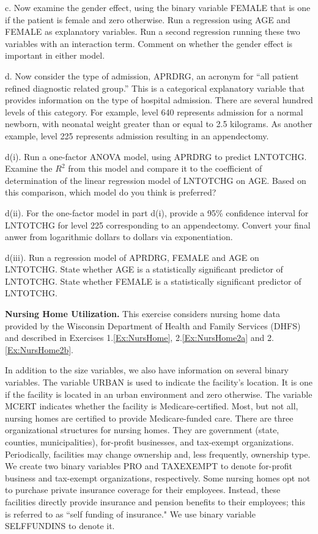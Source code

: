 \begin{exercises}
c. Now examine the gender effect, using the binary variable FEMALE
that is one if the patient is female and zero otherwise. Run a
regression using AGE and FEMALE as explanatory variables. Run a
second regression running these two variables with an interaction
term. Comment on whether the gender effect is important in either
model.

d. Now consider the type of admission, APRDRG, an acronym for ``all
patient refined diagnostic related group.'' This is a categorical
explanatory variable that provides information on the type of
hospital admission. There are several hundred levels of this
category. For example, level 640 represents admission for a normal
newborn, with neonatal weight greater than or equal to 2.5
kilograms. As another example, level 225 represents admission
resulting in an appendectomy.

d(i). Run a one-factor ANOVA model, using APRDRG to predict
LNTOTCHG. Examine the $R^2$ from this model and compare it to the
coefficient of determination of the linear regression model of
LNTOTCHG on AGE. Based on this comparison, which model do you think
is preferred?

d(ii). For the one-factor model in part d(i), provide a 95\%
confidence interval for LNTOTCHG for level 225 corresponding to an
appendectomy. Convert your final anwer from logarithmic dollars to
dollars via exponentiation.

d(iii). Run a regression model of APRDRG, FEMALE and AGE on
LNTOTCHG. State whether AGE is a statistically significant predictor
of LNTOTCHG. State whether FEMALE is a statistically significant
predictor of LNTOTCHG.


\item \textbf{Nursing Home Utilization.}\label{Ex:NursHome4} This exercise considers nursing
home data provided by the Wisconsin Department of Health and Family
Services (DHFS) and described in Exercises 1.\ref{Ex:NursHome},
2.\ref{Ex:NursHome2a} and 2.\ref{Ex:NursHome2b}.

In addition to the size variables, we also have information on
several binary variables. The variable URBAN is used to indicate the
facility's location. It is one if the facility is located in an
urban environment and zero otherwise. The variable MCERT indicates
whether the facility is Medicare-certified. Most, but not all,
nursing homes are certified to provide Medicare-funded care. There
are three organizational structures for nursing homes. They are
government (state, counties, municipalities), for-profit businesses,
and tax-exempt organizations. Periodically, facilities may change
ownership and, less frequently, ownership type. We create two binary
variables PRO and TAXEXEMPT to denote for-profit business and
tax-exempt organizations, respectively. Some nursing homes opt not
to purchase private insurance coverage for their employees. Instead,
these facilities directly provide insurance and pension benefits to
their employees; this is referred to as ``self funding of
insurance." We use binary variable SELFFUNDINS to denote it.


\end{exercises}
